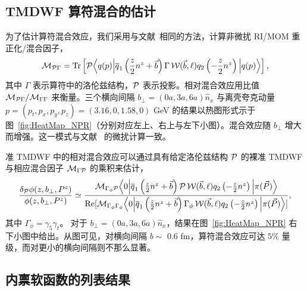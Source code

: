 \subsection{TMDWF 算符混合的估计}\label{subsec:mixing}

{
为了估计算符混合效应，我们采用与文献~\cite{Shanahan:2019zcq,Shanahan:2020zxr}相同的方法，计算非微扰 RI/MOM 重正化/混合因子，
\begin{align}
{\cal M}_{{\cal P}\Gamma}=\textrm{Tr}\left[{\cal P}\Big\langle q(p)\Big|\overline q_1\left(\frac{z }{2}n^z +\vec b\right)\Gamma \,{\cal W}(\vec b,\ell)q_2\left(-\frac{z}{2}n^z \right)\Big| q(p)\Big\rangle\right],
\end{align}
其中 $\Gamma$ 表示算符中的洛伦兹结构，${\cal P}$ 表示投影。相对混合效应用比值 ${\cal M}_{{\cal P}\Gamma}/{\cal M}_{\Gamma\Gamma}$ 来衡量。三个横向间隔 $b_\perp=(0a, 3a, 6a)\hat{n}_x$ 与离壳夸克动量 $p=(p_t,p_x,p_y,p_z)=(3.16,0,1.58,0)$ GeV 的结果以热图形式示于图~\ref{fig:HeatMap_NPR}（分别对应左上、右上与左下小图）。混合效应随 $b_\perp$ 增大而增强。这一模式与文献~\cite{Shanahan:2019zcq} 的微扰计算一致。}

{
准 TMDWF 中的相对混合效应可以通过具有给定洛伦兹结构 ${\cal P}$ 的裸准 TMDWF 与相应混合因子 ${\cal M}_{\Gamma{\cal P}}$ 的乘积来估计，
\begin{align}
\frac{\delta_{{\cal P}}\phi(z,b_\perp,P^z)}{\phi(z,b_\perp,P^z)}\simeq\frac{{\cal M}_{\Gamma_{\phi}{\cal P}}\Big\langle 0\Big|\overline q_1\left(\frac{z }{2}n^z +\vec b\right){\cal P}\,{\cal W}(\vec b,\ell)q_2\left(-\frac{z}{2}n^z \right)\Big| {\pi(\vec{P})}\Big\rangle}{\textrm{Re}[{\cal M}_{\Gamma_{\phi}\Gamma_{\phi}}\Big\langle 0\Big|\overline q_1\left(\frac{z }{2}n^z +\vec b\right){\Gamma_{\phi}}\,{\cal W}(\vec b,\ell)q_2\left(-\frac{z}{2}n^z \right)\Big| {\pi(\vec{P})}\Big\rangle]},
\end{align}
其中 $\Gamma_{\phi}=\gamma_5\gamma_t$。
对于 $b_\perp=(0a, 3a, 6a)\hat{n}_x$，结果在图~\ref{fig:HeatMap_NPR} 右下小图中给出。从图可见，对横向间隔 $b\sim$ 0.6 fm，算符混合效应可达 $5\%$ 量级，而对更小的横向间隔则不那么显著。
}




\subsection{内禀软函数的列表结果}\label{subsec:tabulated}

